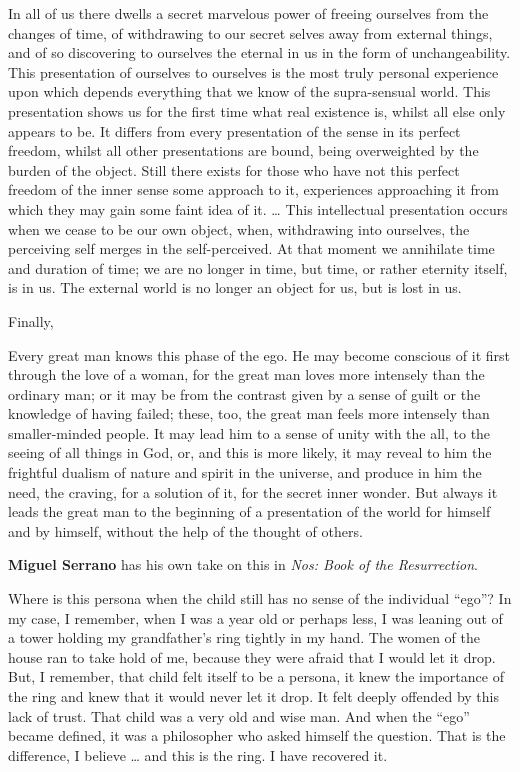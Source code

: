 \begin{quotex}
In all of us there dwells a secret marvelous power of freeing ourselves from the changes of time, of withdrawing to our
secret selves away from external things, and of so discovering to ourselves the eternal in us in the form of
unchangeability. This presentation of ourselves to ourselves is the most truly personal experience upon which depends
everything that we know of the supra-sensual world. This presentation shows us for the first time what real existence
is, whilst all else only appears to be. It differs from every presentation of the sense in its perfect freedom, whilst
all other presentations are bound, being overweighted by the burden of the object. Still there exists for those who
have not this perfect freedom of the inner sense some approach to it, experiences approaching it from which they may
gain some faint idea of it. … This intellectual presentation occurs when we cease to be our own object, when,
withdrawing into ourselves, the perceiving self merges in the self-perceived. At that moment we annihilate time and
duration of time; we are no longer in time, but time, or rather eternity itself, is in us. The external world is no
longer an object for us, but is lost in us. 

\end{quotex}
Finally,

\begin{quotex}
Every great man knows this phase of the ego. He may become conscious of it first through the love of a woman, for the
great man loves more intensely than the ordinary man; or it may be from the contrast given by a sense of guilt or the
knowledge of having failed; these, too, the great man feels more intensely than smaller-minded people. It may lead him
to a sense of unity with the all, to the seeing of all things in God, or, and this is more likely, it may reveal to him
the frightful dualism of nature and spirit in the universe, and produce in him the need, the craving, for a solution of
it, for the secret inner wonder. But always it leads the great man to the beginning of a presentation of the world for
himself and by himself, without the help of the thought of others. 

\end{quotex}
\textbf{Miguel Serrano} has his own take on this in \emph{Nos: Book of the Resurrection}.

\begin{quotex}
Where is this persona when the child still has no sense of the individual “ego”? In my case, I remember, when I was a
year old or perhaps less, I was leaning out of a tower holding my grandfather's ring tightly in my hand.
The women of the house ran to take hold of me, because they were afraid that I would let it drop. But, I remember, that
child felt itself to be a persona, it knew the importance of the ring and knew that it would never let it drop. It felt
deeply offended by this lack of trust. That child was a very old and wise man. And when the “ego” became defined, it
was a philosopher who asked himself the question. That is the difference, I believe … and this is the ring. I have
recovered it. 

\end{quotex}

